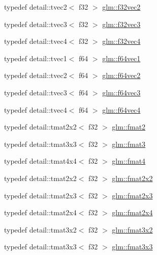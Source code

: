 \begin{DoxyCompactItemize}
\item 
typedef detail\+::tvec2$<$ f32 $>$ \hyperlink{group__gtc__type__precision_ga6262c3e58cb4a96545b9ec56f141fa1a}{glm\+::f32vec2}
\item 
typedef detail\+::tvec3$<$ f32 $>$ \hyperlink{group__gtc__type__precision_ga6bb80987350b58f1869fd877bf70d316}{glm\+::f32vec3}
\item 
typedef detail\+::tvec4$<$ f32 $>$ \hyperlink{group__gtc__type__precision_ga87b80bb1fb0fba6433912ab9aec05f2c}{glm\+::f32vec4}
\item 
typedef detail\+::tvec1$<$ f64 $>$ \hyperlink{group__gtc__type__precision_ga9dabdd8a91258b035759121fa7880cb6}{glm\+::f64vec1}
\item 
typedef detail\+::tvec2$<$ f64 $>$ \hyperlink{group__gtc__type__precision_gabffd600c237af59b1686fce1ef461a84}{glm\+::f64vec2}
\item 
typedef detail\+::tvec3$<$ f64 $>$ \hyperlink{group__gtc__type__precision_ga31fd7a60d11d5ce44f3fad7418c93ec5}{glm\+::f64vec3}
\item 
typedef detail\+::tvec4$<$ f64 $>$ \hyperlink{group__gtc__type__precision_ga5032a5abd2c2a1f18927c9eeef088c7b}{glm\+::f64vec4}
\item 
typedef detail\+::tmat2x2$<$ f32 $>$ \hyperlink{group__gtc__type__precision_ga3b3dcea3b5987db4744388ad0acf22a5}{glm\+::fmat2}
\item 
typedef detail\+::tmat3x3$<$ f32 $>$ \hyperlink{group__gtc__type__precision_ga97f5385bc271a35cbbff8ac6a420c849}{glm\+::fmat3}
\item 
typedef detail\+::tmat4x4$<$ f32 $>$ \hyperlink{group__gtc__type__precision_ga055416da4fe01f31008a03b52a80d174}{glm\+::fmat4}
\item 
typedef detail\+::tmat2x2$<$ f32 $>$ \hyperlink{group__gtc__type__precision_ga36ec90579d358024a0609ae54c85c345}{glm\+::fmat2x2}
\item 
typedef detail\+::tmat2x3$<$ f32 $>$ \hyperlink{group__gtc__type__precision_ga962841878f2520a9ac2859bc2bd467fb}{glm\+::fmat2x3}
\item 
typedef detail\+::tmat2x4$<$ f32 $>$ \hyperlink{group__gtc__type__precision_gaf838bceea05a5b2fe2ea7bbb7d582b1a}{glm\+::fmat2x4}
\item 
typedef detail\+::tmat3x2$<$ f32 $>$ \hyperlink{group__gtc__type__precision_ga8df314d9c425c283d4cec4047b8cf1f6}{glm\+::fmat3x2}
\item 
typedef detail\+::tmat3x3$<$ f32 $>$ \hyperlink{group__gtc__type__precision_gab6848d63c51579e333fa69d335d2664a}{glm\+::fmat3x3}

\end{DoxyCompactItemize}
